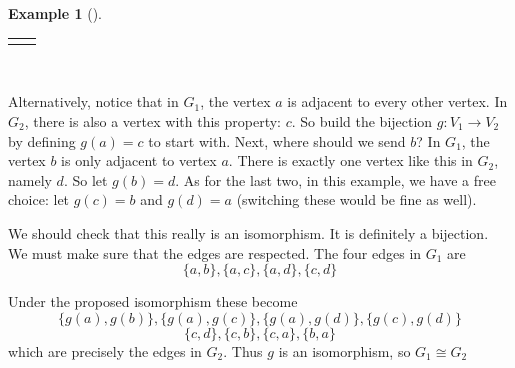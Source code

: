 \documentclass[10pt,]{book}
\theoremstyle{plain}
\theoremstyle{definition}
\theoremstyle{definition}
\newtheorem{example}[theorem]{Example}
\theoremstyle{definition}
\numberwithin{equation}{chapter}
\newlength{\panelmax}
\newcommand{\vtx}[2]{node[fill,circle,inner sep=0pt, minimum size=4pt,label=#1:#2]{}}
\newcommand{\va}[1]{\vtx{above}{#1}}
\newcommand{\vb}[1]{\vtx{below}{#1}}
\newcommand{\vr}[1]{\vtx{right}{#1}}
\newcommand{\vl}[1]{\vtx{left}{#1}}
\begin{document}
\begin{example}[]
{\begin{lrbox}{\panelboxBimage}
{{
}
}\end{lrbox}
\ifdefined\phBimage\else\newlength{\phBimage}\fi%
\setlength{\phBimage}{\ht\panelboxBimage+\dp\panelboxBimage}
\settototalheight{\phBimage}{\usebox{\panelboxBimage}}
\setlength{\panelmax}{\maxof{\panelmax}{\phBimage}}
\leavevmode%
\setlength{\tabcolsep}{0.135\linewidth}
\par\medskip\noindent
\hspace*{0.135\linewidth}%
\begin{tabular}{@{}*{2}{c}@{}}
\begin{minipage}[c][\panelmax][b]{0.23\linewidth}\usebox{\panelboxAimage}\end{minipage}&
\begin{minipage}[c][\panelmax][b]{0.23\linewidth}\usebox{\panelboxBimage}\end{minipage}\end{tabular}\\
}%
\par
\hypertarget{p-61}{}%
Alternatively, notice that in \(G_1\), the vertex \(a\) is adjacent to every other vertex. In \(G_2\), there is also a vertex with this property: \(c\). So build the bijection \(g:V_1 \to V_2\) by defining \(g(a) = c\) to start with. Next, where should we send \(b\)? In \(G_1\), the vertex \(b\) is only adjacent to vertex \(a\). There is exactly one vertex like this in \(G_2\), namely \(d\). So let \(g(b) = d\). As for the last two, in this example, we have a free choice: let \(g(c) = b\) and \(g(d) = a\) (switching these would be fine as well).%
\par
\hypertarget{p-62}{}%
We should check that this really is an isomorphism. It is definitely a bijection. We must make sure that the edges are respected. The four edges in \(G_1\) are%
\begin{equation*}
\{a,b\}, \{a,c\}, \{a,d\}, \{c,d\}
\end{equation*}
%
\par
\hypertarget{p-63}{}%
Under the proposed isomorphism these become%
\begin{equation*}
\{g(a), g(b)\}, \{g(a), g(c)\}, \{g(a), g(d)\}, \{g(c), g(d)\}
\end{equation*}
%
\begin{equation*}
\{c,d\}, \{c,b\}, \{c,a\}, \{b,a\}
\end{equation*}
which are precisely the edges in \(G_2\). Thus \(g\) is an isomorphism, so \(G_1 \cong G_2\)%
\end{example}
\end{document}
